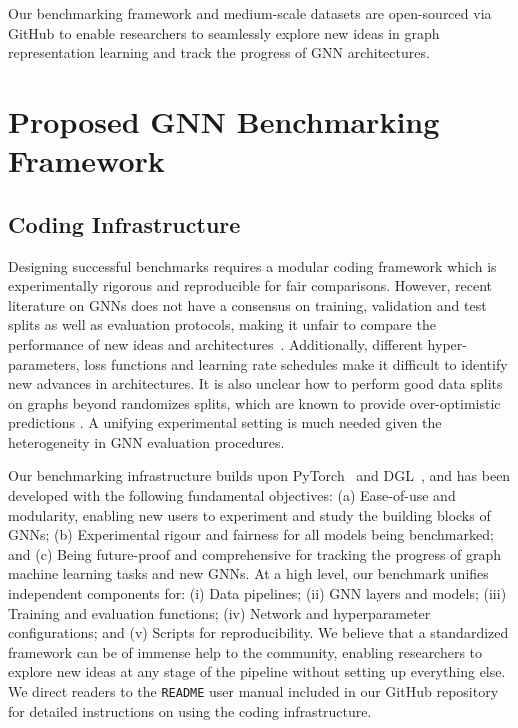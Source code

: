 \documentclass{article}
\begin{document}
Our benchmarking framework and medium-scale datasets are open-sourced via GitHub to enable researchers to seamlessly explore new ideas in graph representation learning and track the progress of GNN architectures. 




















\section{Proposed GNN Benchmarking Framework}

\subsection{Coding Infrastructure}

Designing successful benchmarks requires a modular coding framework which is experimentally rigorous and reproducible for fair comparisons.
However, recent literature on GNNs does not have a consensus on training, validation and test splits as well as evaluation protocols, making it unfair to compare the performance of new ideas and architectures~\cite{errica2019fair}. 
Additionally, different hyper-parameters, loss functions and learning rate schedules make it difficult to identify new advances in architectures.
It is also unclear how to perform good data splits on graphs beyond randomizes splits, which are known to provide over-optimistic predictions \cite{lohr2009sampling}.
A unifying experimental setting is much needed given the heterogeneity in GNN evaluation procedures.

Our benchmarking infrastructure builds upon PyTorch~\cite{paszke2019pytorch} and DGL~\cite{wang2019dgl}, and has been developed with the following fundamental objectives:
(a) Ease-of-use and modularity, enabling new users to experiment and study the building blocks of GNNs;
(b) Experimental rigour and fairness for all models being benchmarked; and
(c) Being future-proof and comprehensive for tracking the progress of graph machine learning tasks and new GNNs.
At a high level, our benchmark unifies independent components for:
(i) Data pipelines; 
(ii) GNN layers and models; 
(iii) Training and evaluation functions;
(iv) Network and hyperparameter configurations; and 
(v) Scripts for reproducibility. 
We believe that a standardized framework can be of immense help to the community, enabling researchers to explore new ideas at any stage of the pipeline without setting up everything else. 
We direct readers to the \texttt{README} user manual included in our GitHub repository for detailed instructions on using the coding infrastructure.
\end{document}
